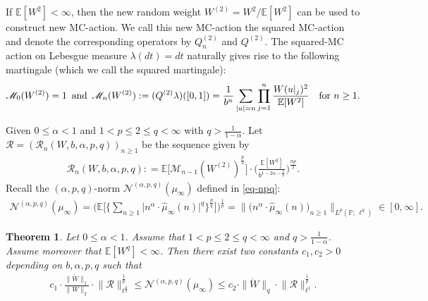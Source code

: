 \documentclass[12pt]{amsart}
\newtheorem{theorem}{Theorem}[section]
\theoremstyle{definition}
\theoremstyle{remark}
\newcommand{\E}{\mathbb{E}}
\newcommand{\PP}{\mathbb{P}}
\newcommand{\MAA}{\mathscr{M}_{n-1}(W^{(2)})}
\newcommand{\MAB}{\mathscr{M}_{n}(W^{(2)})}
\newcommand{\an}{\text{\, and \,}}
\newcommand{\NQ}{\mathcal{N}^{(\alpha, p, q)}}
\numberwithin{equation}{section}
\begin{document}
If $\E[W^2]<\infty$,  then the new random weight $W^{(2)} = W^2/\E[W^2]$ can be used to construct new MC-action. We call this new MC-action the squared MC-action and denote the corresponding operators by $Q^{(2)}_n$ and $Q^{(2)}$.   The squared-MC action on Lebesgue measure $\lambda(dt)= dt$ naturally gives rise to the following martingale (which we call the squared martingale): 
\begin{align}\label{eqn-def-mnab}
\mathscr{M}_0(W^{(2)})=1 \an 
\MAB:=(Q^{(2)} \lambda) ([0,1]) = \frac{1}{b^n}\sum_{|u|=n}\prod_{j=1}^n \frac{W(u|_j)^2}{\E[W^2]} \quad \text{for $n\geq 1$}.
\end{align}


Given $0\le \alpha<1$ and $1< p\le 2 \le q <\infty$ with $q> \frac{1}{1 - \alpha}$.  Let $\mathcal{R}= (\mathcal{R}_n(W, b, \alpha, p, q))_{n\ge 1}$ be the sequence  given by 
\begin{align}\label{def-Rn}
\mathcal{R}_n  (W, b, \alpha, p, q)  : =  \E \big[  \MAA^{\frac{p}{2}}\big] \cdot \Big(  \frac{\E[W^2]}{b^{1- 2\alpha- \frac{2}{q}}}\Big)^{\frac{np}{2}}. 
\end{align}
Recall  the $(\alpha,p,q)$-norm  $\mathcal{N}^{(\alpha, p, q)}(\mu_\infty)$  defined in  \eqref{eq-npq}:
\begin{align*}
\mathcal{N}^{(\alpha, p, q)}(\mu_\infty)=   \Big(\E\Big[  \Big\{ \sum_{n \ge 1}    \big| n^{\alpha} \cdot \widehat{\mu}_\infty(n)\big|^q  \Big\}^{\frac{p}{q}}\Big] \Big)^{\frac{1}{p}}   = \Big\|  \big( n^{\alpha} \cdot \widehat{\mu}_\infty(n) \big)_{n \ge 1}  \Big\|_{L^p(\PP; \, \ell^q)}\in[0,\infty].
\end{align*}
\begin{theorem}\label{thm-CCM}
Let $0\le \alpha<1$.  Assume that $1< p\le 2 \le q <\infty$ and $q> \frac{1}{1 - \alpha}$.  Assume moreover that $\E[W^q]<\infty$. Then there exist two constants $c_1, c_2>0$ depending on $b, \alpha, p, q$ such that 
\begin{align*}
c_1  \cdot   \frac{\|\mathring{W}\|_1}{\|W\|_2}  \cdot  \big\|\mathcal{R}\big\|_{\ell^{\frac{p}{q}}}^{\frac{1}{p}}
 \le   \NQ(\mu_\infty) 
\le c_2  \cdot  \|\mathring{W}\|_q     \cdot \big\|\mathcal{R}\big\|_{\ell^1}^{\frac{1}{p}}.
\end{align*}


\end{theorem} 
\end{document}
